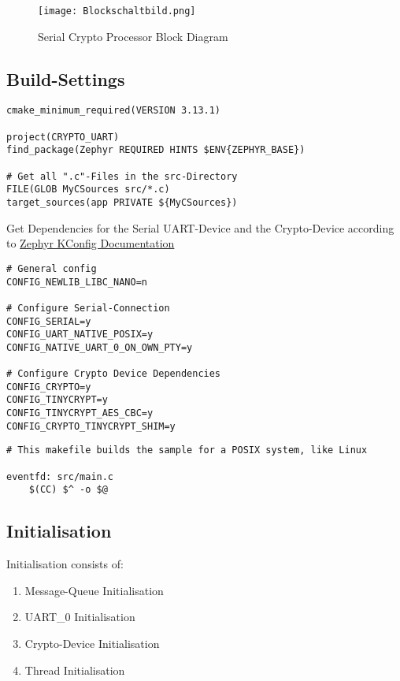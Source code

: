 \begin{figure}[!ht]
	\begin{center}
		\texttt{[image: Blockschaltbild.png]}
		\caption{Serial Crypto Processor Block Diagram}
	\end{center}
\end{figure}

\pagebreak

\subsection{Build-Settings}

\begin{lstlisting}[caption=CMakelists.txt]
cmake_minimum_required(VERSION 3.13.1)

project(CRYPTO_UART)
find_package(Zephyr REQUIRED HINTS $ENV{ZEPHYR_BASE})

# Get all ".c"-Files in the src-Directory
FILE(GLOB MyCSources src/*.c)
target_sources(app PRIVATE ${MyCSources})
\end{lstlisting}

Get Dependencies for the Serial UART-Device and the Crypto-Device
according to
\href{https://docs.zephyrproject.org/2.4.0/reference/kconfig/index-all.html}
{Zephyr KConfig Documentation}

\begin{lstlisting}[caption=prj.conf]
# General config
CONFIG_NEWLIB_LIBC_NANO=n

# Configure Serial-Connection
CONFIG_SERIAL=y
CONFIG_UART_NATIVE_POSIX=y
CONFIG_NATIVE_UART_0_ON_OWN_PTY=y

# Configure Crypto Device Dependencies
CONFIG_CRYPTO=y
CONFIG_TINYCRYPT=y
CONFIG_TINYCRYPT_AES_CBC=y
CONFIG_CRYPTO_TINYCRYPT_SHIM=y
\end{lstlisting}

\begin{lstlisting}[caption=Makefile.posix]
# This makefile builds the sample for a POSIX system, like Linux

eventfd: src/main.c
	$(CC) $^ -o $@
\end{lstlisting}

\pagebreak

\subsection{Initialisation}

Initialisation consists of:
\begin{enumerate}
	\item Message-Queue Initialisation
	\item UART\_0 Initialisation
	\item Crypto-Device Initialisation
	\item Thread Initialisation
\end{enumerate}


